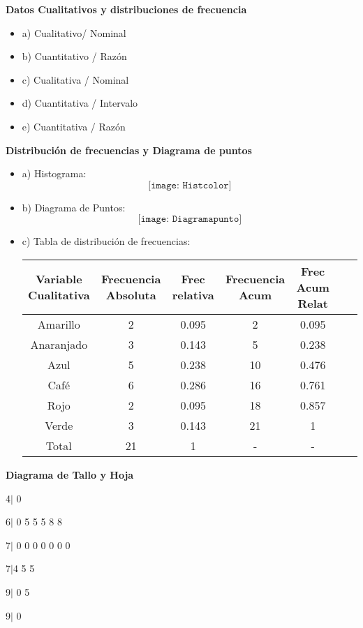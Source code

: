 \documentclass{oxmathproblems}
\begin{document}
\begin{questions}
\miquestion \textbf{Datos Cualitativos y distribuciones de frecuencia}

\begin{itemize}
\item  a) Cualitativo/ Nominal 
\item  b) Cuantitativo / Razón
\item  c) Cualitativa / Nominal 
\item  d) Cuantitativa / Intervalo
\item  e) Cuantitativa / Razón
\end{itemize}

\miquestion \textbf {Distribución de frecuencias y Diagrama de puntos}

\begin{itemize}
\item  a) Histograma: 
$$\texttt{[image: Histcolor]}$$
\item  b) Diagrama de Puntos: 
$$\texttt{[image: Diagramapunto]}$$
\item  c) Tabla de distribución de frecuencias: 
\begin{center}
\begin{tabular}{ |c|c|c|c|c|c|c|} 
\hline
Variable Cualitativa & Frecuencia Absoluta & Frec relativa & Frecuencia Acum & Frec Acum Relat   \\
\hline
Amarillo &2 &0.095 & 2 & 0.095\\
Anaranjado &3& 0.143 & 5 & 0.238\\
Azul  & 5  & 0.238  & 10 & 0.476\\
Café & 6 & 0.286 &  16 &0.761\\
Rojo & 2 & 0.095 & 18 & 0.857\\
Verde & 3 & 0.143 & 21 & 1 \\
Total & 21 & 1 &- & - \\
\hline
\end{tabular}
\end{center}

\end{itemize}

\miquestion \textbf { Diagrama de Tallo y Hoja} 

4$\mid$ 0 

6$\mid$ 0 5 5 5 8 8 

7$\mid$ 0 0 0 0 0 0 0 

7$\mid$4  5 5 

9$\mid$ 0 5 

 9$\mid$ 0 




\end{questions}
\end{document}

